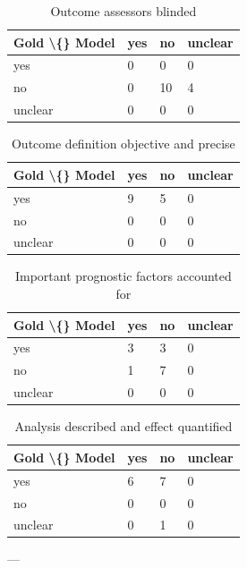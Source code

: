 \documentclass[11pt,a4paper]{article}
\begin{document}
\begin{table}[H]
\centering
\caption{Outcome assessors blinded}
\label{tab:supp_29}
\begin{tabular}{llll}
\toprule
Gold \textbackslash\{\} Model & yes & no & unclear \\
\midrule
yes & 0 & 0 & 0 \\
no & 0 & 10 & 4 \\
unclear & 0 & 0 & 0 \\
\bottomrule
\end{tabular}
\end{table}

\begin{table}[H]
\centering
\caption{Outcome definition objective and precise}
\label{tab:supp_30}
\begin{tabular}{llll}
\toprule
Gold \textbackslash\{\} Model & yes & no & unclear \\
\midrule
yes & 9 & 5 & 0 \\
no & 0 & 0 & 0 \\
unclear & 0 & 0 & 0 \\
\bottomrule
\end{tabular}
\end{table}

\begin{table}[H]
\centering
\caption{Important prognostic factors accounted for}
\label{tab:supp_31}
\begin{tabular}{llll}
\toprule
Gold \textbackslash\{\} Model & yes & no & unclear \\
\midrule
yes & 3 & 3 & 0 \\
no & 1 & 7 & 0 \\
unclear & 0 & 0 & 0 \\
\bottomrule
\end{tabular}
\end{table}

\begin{table}[H]
\centering
\caption{Analysis described and effect quantified}
\label{tab:supp_32}
\begin{tabular}{llll}
\toprule
Gold \textbackslash\{\} Model & yes & no & unclear \\
\midrule
yes & 6 & 7 & 0 \\
no & 0 & 0 & 0 \\
unclear & 0 & 1 & 0 \\
\bottomrule
\end{tabular}
\end{table}

---
\end{document}
